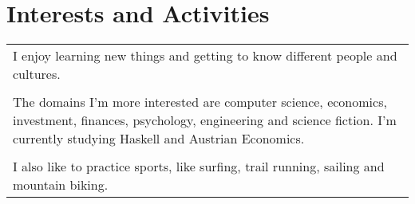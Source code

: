 \documentclass[a4paper,10pt]{article} %
\begin{document}

\section{Interests and Activities}
\begin{tabular}{p{13cm}}
\hspace{2em} I enjoy learning new things and getting to know different
people and cultures. \\ \\
\hspace{2em} The domains I'm more interested are computer science,
economics, investment, finances, psychology, engineering and science
fiction. I'm currently studying Haskell and Austrian Economics.\\ \\
\hspace{2em} I also like to practice sports, like surfing, trail
running, sailing and mountain biking.
\end{tabular}
\end{document}
